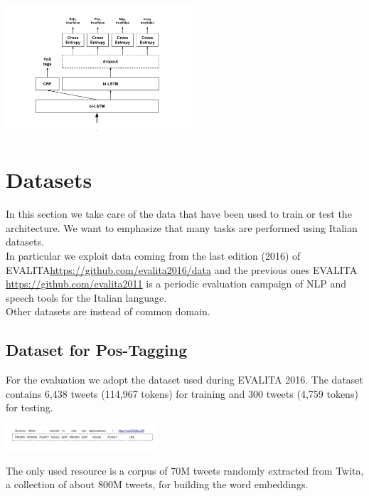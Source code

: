 \documentclass[twocolumn,10pt]{wmrDoc}
\begin{document}
\vskip 0.5cm

\includegraphics[width=0.52\textwidth]{figure/Architettura2.png}
 
\section{Datasets}
In this section we take care of the data that have been used to train or test the architecture.
We want to emphasize that many tasks are performed using Italian datasets.\\
In particular we exploit data coming from the last edition (2016) of EVALITA\url{https://github.com/evalita2016/data} and the previous ones EVALITA \url{https://github.com/evalita2011} is a periodic evaluation campaign of NLP and speech tools for the Italian language.\\
Other datasets are instead of common domain.

\subsection{Dataset for Pos-Tagging}
For the evaluation we adopt the dataset used during EVALITA 2016.
The dataset contains 6,438 tweets (114,967 tokens) for training and 300 tweets (4,759 tokens) for testing.

\vskip 0.5cm
\includegraphics[width=0.42\textwidth]{figure/postexample.png}
\vskip 0.5cm

The only used resource is a corpus of 70M tweets randomly extracted from Twita, a collection of about 800M tweets, for building the word embeddings.

\vskip 1cm
\end{document}
